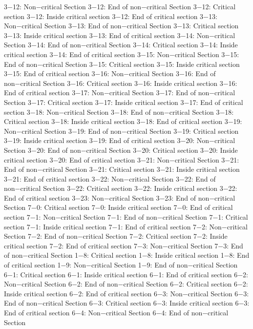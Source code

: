 3−12: Non−critical Section
3−12: End of non−critical Section
3−12: Critical section
3−12: Inside critical section
3−12: End of critical section
3−13: Non−critical Section
3−13: End of non−critical Section
3−13: Critical section
3−13: Inside critical section
3−13: End of critical section
3−14: Non−critical Section
3−14: End of non−critical Section
3−14: Critical section
3−14: Inside critical section
3−14: End of critical section
3−15: Non−critical Section
3−15: End of non−critical Section
3−15: Critical section
3−15: Inside critical section
3−15: End of critical section
3−16: Non−critical Section
3−16: End of non−critical Section
3−16: Critical section
3−16: Inside critical section
3−16: End of critical section
3−17: Non−critical Section
3−17: End of non−critical Section
3−17: Critical section
3−17: Inside critical section
3−17: End of critical section
3−18: Non−critical Section
3−18: End of non−critical Section
3−18: Critical section
3−18: Inside critical section
3−18: End of critical section
3−19: Non−critical Section
3−19: End of non−critical Section
3−19: Critical section
3−19: Inside critical section
3−19: End of critical section
3−20: Non−critical Section
3−20: End of non−critical Section
3−20: Critical section
3−20: Inside critical section
3−20: End of critical section
3−21: Non−critical Section
3−21: End of non−critical Section
3−21: Critical section
3−21: Inside critical section
3−21: End of critical section
3−22: Non−critical Section
3−22: End of non−critical Section
3−22: Critical section
3−22: Inside critical section
3−22: End of critical section
3−23: Non−critical Section
3−23: End of non−critical Section
7−0: Critical section
7−0: Inside critical section
7−0: End of critical section
7−1: Non−critical Section
7−1: End of non−critical Section
7−1: Critical section
7−1: Inside critical section
7−1: End of critical section
7−2: Non−critical Section
7−2: End of non−critical Section
7−2: Critical section
7−2: Inside critical section
7−2: End of critical section
7−3: Non−critical Section
7−3: End of non−critical Section
1−8: Critical section
1−8: Inside critical section
1−8: End of critical section
1−9: Non−critical Section
1−9: End of non−critical Section
6−1: Critical section
6−1: Inside critical section
6−1: End of critical section
6−2: Non−critical Section
6−2: End of non−critical Section
6−2: Critical section
6−2: Inside critical section
6−2: End of critical section
6−3: Non−critical Section
6−3: End of non−critical Section
6−3: Critical section
6−3: Inside critical section
6−3: End of critical section
6−4: Non−critical Section
6−4: End of non−critical Section
